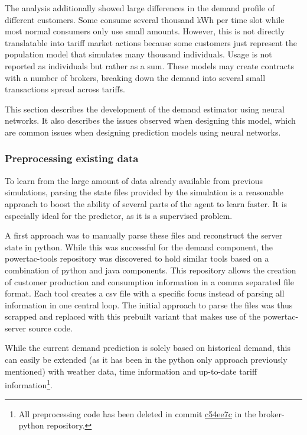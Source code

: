 The analysis additionally showed large differences in the demand profile of different customers. Some consume several thousand
\ac{kWh} per time slot while most normal consumers only use small amounts. However, this is not directly
translatable into tariff market actions because some customers just represent the population model that simulates many
thousand individuals. Usage is not reported as individuals but rather as a sum. These models may create contracts with a
number of brokers, breaking down the demand into several small transactions spread across tariffs.

This section describes the development of the demand estimator using neural networks. It also describes the issues
observed when designing this model, which are common issues when designing prediction models using neural networks.

\subsubsection{Preprocessing existing data}
\label{sub:preprocessing}


To learn from the large amount of data already available from previous simulations, parsing the state files provided by
the simulation is a reasonable approach to boost the ability of several parts of the agent to learn faster. It is
especially ideal for the predictor, as it is a supervised problem.

A first approach was to manually parse these files and reconstruct the server state in python.
While this was successful for the demand component, the powertac-tools repository was discovered to hold similar tools
based on a combination of python and java components. This repository allows the creation of customer production and
consumption information in a comma separated file format. Each tool creates a csv file with a specific focus instead of
parsing all information in one central loop. The initial approach to parse the files was thus scrapped
and replaced with this prebuilt variant that makes use of the powertac-server source code.

While the current demand prediction is solely based on historical demand, this can easily be extended (as it has been in
the python only approach previously mentioned) with weather data, time information and up-to-date tariff
information\footnote{All preprocessing code has been deleted in commit
    \href{https://github.com/pascalwhoop/broker-python/commit/c54ee7c05585d15462f40e2be6850343e8aea27a}{c54ee7c} in the
broker-python repository.}.



